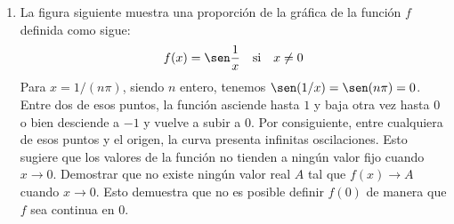 \begin{enumerate}[\bfseries 1.]
    \item La figura siguiente muestra una proporción de la gráfica de la función $f$ definida como sigue:
	$$f(x)=\sen \dfrac{1}{x}\quad \mbox{si}\quad x\neq 0$$
	Para $x=1/(n\pi)$, siendo $n$ entero, tenemos $\sen(1/x)=\sen(n\pi)=0$. Entre dos de esos puntos, la función asciende hasta $1$ y baja otra vez hasta $0$ o bien desciende a $-1$ y vuelve a subir a $0$. Por consiguiente, entre cualquiera de esos puntos y el origen, la curva presenta infinitas oscilaciones. Esto sugiere que los valores de la función no tienden a ningún valor fijo cuando $x\to 0$. Demostrar que no existe ningún valor real $A$ tal que $f(x)\to A$ cuando $x\to 0.$ Esto demuestra que no es posible definir $f(0)$ de manera que $f$ sea continua en $0$.\\
	    \begin{center}
	    \end{center}
	    \vspace{.5cm}


\end{enumerate}

